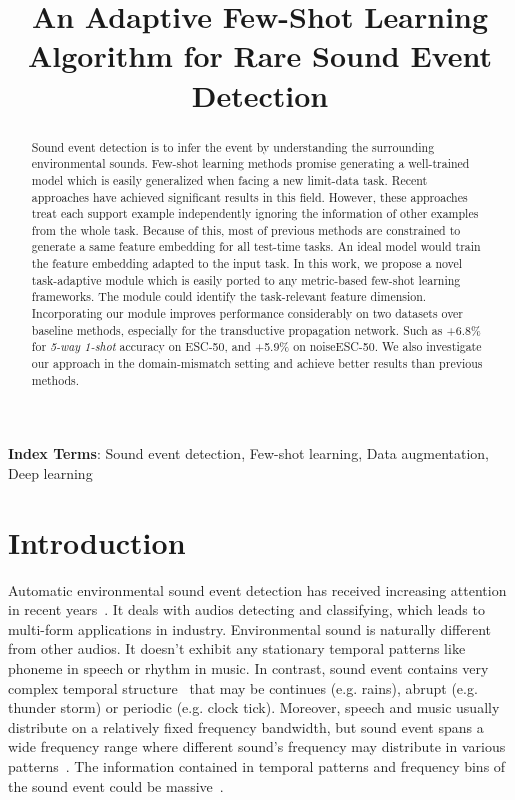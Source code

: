 \documentclass[a4paper]{article}
\title{An Adaptive Few-Shot Learning  Algorithm for Rare Sound Event Detection}
\begin{document}
\maketitle 
\begin{abstract}
  Sound event detection is to infer the event by understanding the surrounding environmental sounds. 
  Few-shot learning methods promise generating a well-trained model which is easily generalized when facing a new limit-data task. 
  Recent approaches have achieved significant results in this field. However, these approaches treat each support example independently ignoring the information of other examples from the whole task. 
  Because of this, most of previous methods are constrained to generate a same feature embedding for all test-time tasks. An ideal model would train the feature embedding adapted to the input task. 
  In this work, we propose a novel task-adaptive module which is easily ported to any metric-based few-shot learning frameworks. The module could identify the task-relevant feature dimension. Incorporating our module improves performance considerably on two datasets over baseline methods, especially for the transductive propagation network. Such as +6.8\% for \textit{5-way 1-shot} accuracy on ESC-50, and +5.9\% on noiseESC-50. We also investigate our approach in the domain-mismatch setting and achieve better results than previous methods.
\end{abstract} 
\noindent\textbf{Index Terms}: Sound event detection, Few-shot learning, Data augmentation, Deep learning
\vspace{-1mm}
\section{Introduction}
\label{sec:intro}
\vspace{-1.5mm}
Automatic environmental sound event detection has received increasing attention in recent years~\cite{TUTDatatbase}. It deals with audios detecting and classifying, which leads to multi-form applications in industry. Environmental sound is naturally different from other audios. It doesn't exhibit any stationary temporal patterns like phoneme in speech or rhythm in music. In contrast, sound event contains very complex temporal structure~\cite{sed1,sed2,se} that may be continues (e.g. rains), abrupt (e.g. thunder storm) or periodic (e.g. clock tick). Moreover, speech and music usually distribute on a relatively fixed frequency bandwidth, but sound event spans a wide frequency range where different sound’s frequency may distribute in various patterns~\cite{su2017weakly,pert}. The information contained in temporal patterns and frequency bins of the sound event could be massive~\cite{tf}.
\end{document}
